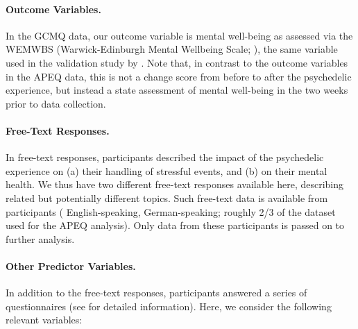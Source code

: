 \documentclass[man,floatsintext]{apa7}
\begin{document}
\paragraph{Outcome Variables.} In the GCMQ data, our outcome variable is mental well-being as assessed via the WEMWBS (Warwick-Edinburgh Mental Wellbeing
Scale; \cite{tennant2007warwick}), the same variable used in the validation study by \textcite{wolff2024measuring}. Note that, in contrast to the outcome variables in the APEQ data, this is not a change score from before to after the psychedelic experience, but instead a state assessment of mental well-being in the two weeks prior to data collection.

\paragraph{Free-Text Responses.} In free-text responses, participants described the impact of the psychedelic experience on (a) their handling of stressful events, and  (b) on their mental health. We thus have two different free-text responses available here, describing related but potentially different topics. Such free-text data is available from  participants ( English-speaking,  German-speaking; roughly 2/3 of the dataset used for the APEQ analysis). Only data from these  participants is passed on to further analysis.

\paragraph{Other Predictor Variables.} In addition to the free-text responses, participants answered a series of questionnaires (see  \cite{wolff2024measuring} for detailed information). Here, we consider the following relevant variables:
\end{document}
